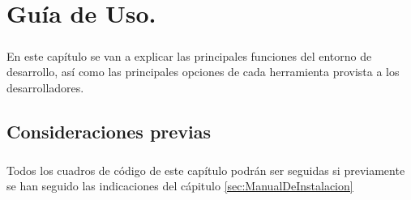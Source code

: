 \chapter{Guía de Uso.}\label{sec:GuiaDeUso}

\paragraph{}En este capítulo se van a explicar las principales funciones del entorno de
desarrollo, así como las principales opciones de cada herramienta provista a los
desarrolladores.

\section{Consideraciones previas}

\paragraph{}Todos los cuadros de código de este capítulo podrán ser seguidas si previamente
se han seguido las indicaciones del cápitulo \ref{sec:ManualDeInstalacion}

